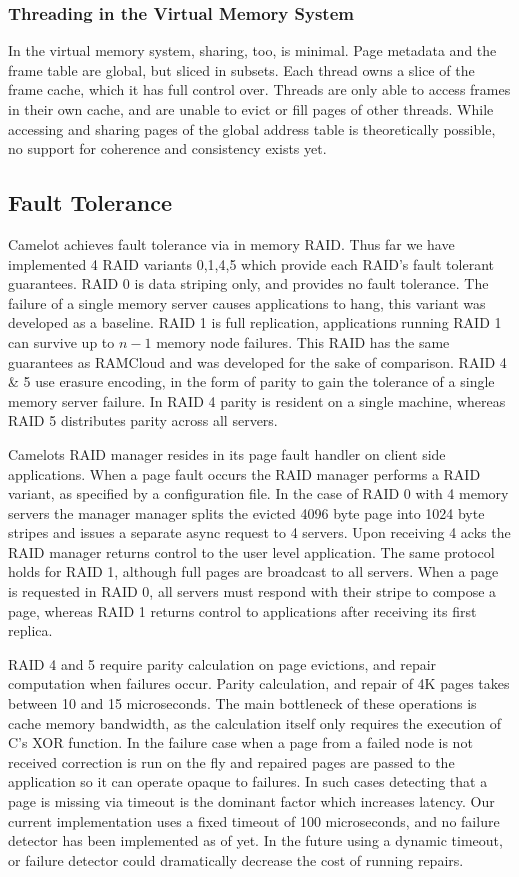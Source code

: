\subsubsection{Threading in the Virtual Memory System}
In the virtual memory system,  sharing, too, is minimal. Page metadata and the frame table are global, but sliced in subsets. Each thread owns a slice of the frame cache, which it has full control over. Threads are only able to access frames in their own cache, and are unable to evict or fill pages of other threads. While accessing and sharing pages of the global address table is theoretically possible, no support for coherence and consistency exists yet. 

\subsection{Fault Tolerance} 
Camelot achieves fault tolerance via in memory RAID. Thus far we have
implemented 4 RAID variants 0,1,4,5 which provide each RAID's fault
tolerant guarantees. RAID 0 is data striping only, and provides no
fault tolerance. The failure of a single memory server causes
applications to hang, this variant was developed as a baseline. RAID 1
is full replication, applications running RAID 1 can survive up to
$n-1$ memory node failures. This RAID has the same guarantees as
RAMCloud and was developed for the sake of comparison. RAID 4 \& 5
use erasure encoding, in the form of parity to gain the tolerance of
a single memory server failure. In RAID 4 parity is resident on a
single machine, whereas RAID 5 distributes parity across all servers.

Camelots RAID manager resides in its page fault handler on client side
applications. When a page fault occurs the RAID manager performs a
RAID variant, as specified by a configuration file. In the case of
RAID 0 with 4 memory servers the manager manager splits the evicted
4096 byte page into 1024 byte stripes and issues a separate async
request to 4 servers. Upon receiving 4 acks the RAID manager returns
control to the user level application. The same protocol holds for
RAID 1, although full pages are broadcast to all servers. When a page
is requested in RAID 0, all servers must respond with their stripe to
compose a page, whereas RAID 1 returns control to applications after
receiving its first replica.

RAID 4 and 5 require parity calculation on page evictions, and
repair computation when failures occur. Parity calculation, and
repair of 4K pages takes between 10 and 15 microseconds. The main
bottleneck of these operations is cache memory bandwidth, as the
calculation itself only requires the execution of C's XOR function. In
the failure case when a page from a failed node is not received
correction is run on the fly and repaired pages are passed to the
application so it can operate opaque to failures. In such cases
detecting that a page is missing via timeout is the dominant factor
which increases latency. Our current implementation uses a fixed
timeout of 100 microseconds, and no failure detector has been
implemented as of yet. In the future using a dynamic timeout, or
failure detector could dramatically decrease the cost of running
repairs.


